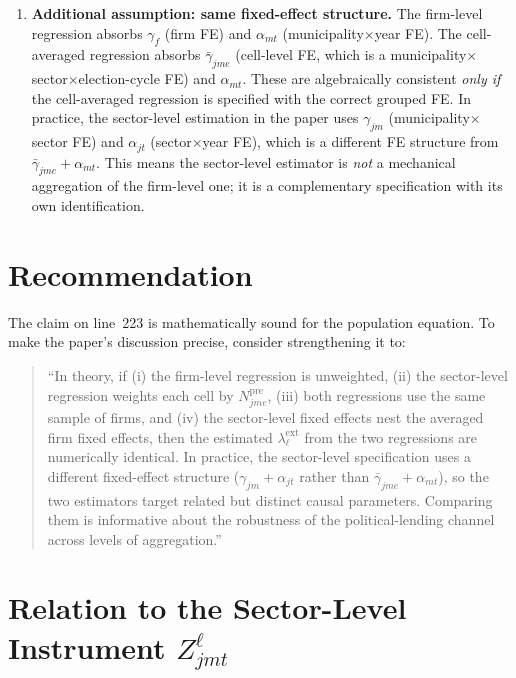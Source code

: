 \documentclass{article}
\theoremstyle{plain}
\begin{document}
\begin{enumerate}
  \item \textbf{Additional assumption: same fixed-effect structure.}
    The firm-level regression absorbs $\gamma_f$ (firm FE) and $\alpha_{mt}$
    (municipality$\times$year FE).  The cell-averaged regression absorbs
    $\bar\gamma_{jme}$ (cell-level FE, which is a
    municipality$\times$sector$\times$election-cycle FE) and $\alpha_{mt}$.
    These are algebraically consistent \emph{only if} the cell-averaged
    regression is specified with the correct grouped FE.  In practice, the
    sector-level estimation in the paper uses $\gamma_{jm}$
    (municipality$\times$sector FE) and $\alpha_{jt}$ (sector$\times$year FE),
    which is a different FE structure from
    $\bar\gamma_{jme} + \alpha_{mt}$.  This means the sector-level estimator
    is \emph{not} a mechanical aggregation of the firm-level one; it is a
    complementary specification with its own identification.
\end{enumerate}

\section{Recommendation}

The claim on line~223 is mathematically sound for the population equation.
To make the paper's discussion precise, consider strengthening it to:

\begin{quote}
  ``In theory, if (i) the firm-level regression is unweighted, (ii)
  the sector-level regression weights each cell by $N^\mathrm{pre}_{jme}$,
  (iii) both regressions use the same sample of firms, and (iv) the
  sector-level fixed effects nest the averaged firm fixed effects,
  then the estimated $\lambda^\mathrm{ext}_\ell$ from the two regressions
  are numerically identical.  In practice, the sector-level specification
  uses a different fixed-effect structure
  ($\gamma_{jm} + \alpha_{jt}$ rather than $\bar\gamma_{jme} + \alpha_{mt}$),
  so the two estimators target related but distinct causal parameters.
  Comparing them is informative about the robustness of the political-lending
  channel across levels of aggregation.''
\end{quote}

\section{Relation to the Sector-Level Instrument $Z^\ell_{jmt}$}
\end{document}
